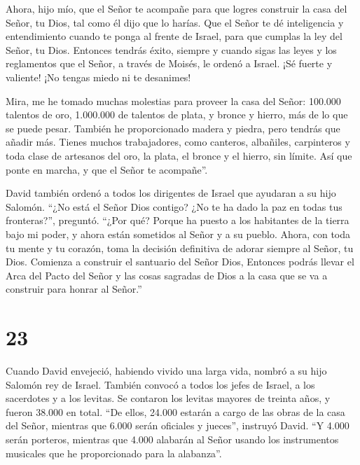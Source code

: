 Ahora, hijo mío, que el Señor te acompañe para que logres
construir la casa del Señor, tu Dios, tal como él dijo que lo harías.
 Que el Señor te dé inteligencia y entendimiento cuando te
ponga al frente de Israel, para que cumplas la ley del Señor, tu Dios.
 Entonces tendrás éxito, siempre y cuando sigas las leyes y
los reglamentos que el Señor, a través de Moisés, le ordenó a Israel.
¡Sé fuerte y valiente! ¡No tengas miedo ni te desanimes!

 Mira, me he tomado muchas molestias para proveer la casa
del Señor: 100.000 talentos de oro, 1.000.000 de talentos de plata, y
bronce y hierro, más de lo que se puede pesar.  También he
proporcionado madera y piedra, pero tendrás que añadir más.
 Tienes muchos trabajadores, como canteros, albañiles,
carpinteros y toda clase de artesanos del oro, la plata, el bronce y el
hierro, sin límite. Así que ponte en marcha, y que el Señor te
acompañe''.

 David también ordenó a todos los dirigentes de Israel que
ayudaran a su hijo Salomón.  ``¿No está el Señor Dios
contigo? ¿No te ha dado la paz en todas tus fronteras?'', preguntó.
``¿Por qué? Porque ha puesto a los habitantes de la tierra bajo mi
poder, y ahora están sometidos al Señor y a su pueblo. 
Ahora, con toda tu mente y tu corazón, toma la decisión definitiva de
adorar siempre al Señor, tu Dios. Comienza a construir el santuario del
Señor Dios, Entonces podrás llevar el Arca del Pacto del Señor y las
cosas sagradas de Dios a la casa que se va a construir para honrar al
Señor.''

\hypertarget{section-22}{%
\section{23}\label{section-22}}

 Cuando David envejeció, habiendo vivido una larga vida,
nombró a su hijo Salomón rey de Israel.  También convocó a
todos los jefes de Israel, a los sacerdotes y a los levitas.
 Se contaron los levitas mayores de treinta años, y fueron
38.000 en total.  ``De ellos, 24.000 estarán a cargo de las
obras de la casa del Señor, mientras que 6.000 serán oficiales y
jueces'', instruyó David.  ``Y 4.000 serán porteros,
mientras que 4.000 alabarán al Señor usando los instrumentos musicales
que he proporcionado para la alabanza''.

